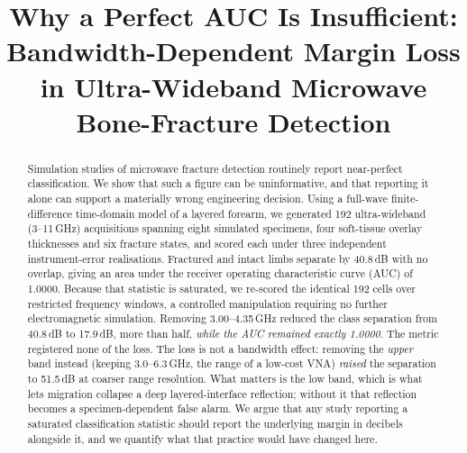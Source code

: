 \documentclass[conference]{IEEEtran}
\begin{document}
\title{Why a Perfect AUC Is Insufficient: Bandwidth-Dependent Margin Loss
in Ultra-Wideband Microwave Bone-Fracture Detection}

\author{
\and
{}
}

\maketitle

\begin{abstract}
Simulation studies of microwave fracture detection routinely report
near-perfect classification. We show that such a figure can be
uninformative, and that reporting it alone can support a materially wrong
engineering decision. Using a full-wave finite-difference time-domain model
of a layered forearm, we generated 192 ultra-wideband (3--11\,GHz)
acquisitions spanning eight simulated specimens, four soft-tissue overlay
thicknesses and six fracture states, and scored each under three independent
instrument-error realisations. Fractured and intact limbs separate by
40.8\,dB with no overlap, giving an area under the receiver operating
characteristic curve (AUC) of 1.0000. Because that statistic is saturated,
we re-scored the identical 192 cells over restricted frequency windows, a
controlled manipulation requiring no further electromagnetic simulation.
Removing 3.00--4.35\,GHz reduced the class separation from 40.8\,dB to
17.9\,dB, more than half, \emph{while the AUC remained exactly 1.0000}. The
metric registered none of the loss. The loss is not a bandwidth effect:
removing the \emph{upper} band instead (keeping 3.0--6.3\,GHz, the range of
a low-cost VNA) \emph{raised} the separation to 51.5\,dB at coarser range
resolution. What matters is the low band, which is what lets migration
collapse a deep layered-interface reflection; without it that reflection
becomes a specimen-dependent false alarm. We argue that any study reporting a
saturated classification statistic should report the underlying margin in
decibels alongside it, and we quantify what that practice would have changed
here.
\end{abstract}
\end{document}
